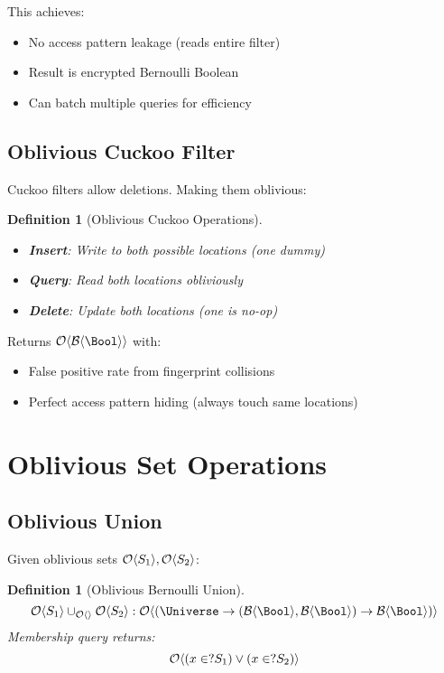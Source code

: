 \documentclass[11pt,final,hidelinks]{article}
\newcommand{\BernBool}{\mathcal{B}\langle \Bool \rangle}
\newtheorem{definition}[theorem]{Definition}
\begin{document}
This achieves:
\begin{itemize}
    \item No access pattern leakage (reads entire filter)
    \item Result is encrypted Bernoulli Boolean
    \item Can batch multiple queries for efficiency
\end{itemize}

\subsection{Oblivious Cuckoo Filter}

Cuckoo filters allow deletions. Making them oblivious:

\begin{definition}[Oblivious Cuckoo Operations]
\begin{itemize}
    \item \textbf{Insert}: Write to both possible locations (one dummy)
    \item \textbf{Query}: Read both locations obliviously
    \item \textbf{Delete}: Update both locations (one is no-op)
\end{itemize}
\end{definition}

Returns $\Obv{\BernBool}$ with:
\begin{itemize}
    \item False positive rate from fingerprint collisions
    \item Perfect access pattern hiding (always touch same locations)
\end{itemize}

\section{Oblivious Set Operations}

\subsection{Oblivious Union}

Given oblivious sets $\mathcal{O}\langle S_1 \rangle, \mathcal{O}\langle S_2 \rangle$:

\begin{definition}[Oblivious Bernoulli Union]
\begin{equation}
\Obv{S_1} \cup_{\Obv{}} \Obv{S_2} : \ObvMap{\Universe}{(\BernBool, \BernBool) \to \BernBool}
\end{equation}
Membership query returns:
\begin{equation}
\mathcal{O}\langle (x \in? S_1) \lor (x \in? S_2) \rangle
\end{equation}
\end{definition}
\end{document}
